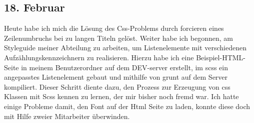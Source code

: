 \subsection{18. Februar}
Heute habe ich mich die Lösung des Css-Problems durch forcieren eines Zeilenumbruchs bei zu langen Titeln gelöst. Weiter habe ich begonnen, am Styleguide meiner Abteilung zu arbeiten, um Listenelemente mit verschiedenen Aufzählungskennzeichnern zu realisieren. Hierzu habe ich eine Beispiel-HTML-Seite in meinem Benutzerordner auf dem DEV-server erstellt, im scss ein angepasstes Listenelement gebaut und mithilfe von grunt auf dem Server kompiliert. Dieser Schritt diente dazu, den Prozess zur Erzeugung von css Klassen mit Scss kennen zu lernen, der mir bisher noch fremd war. Ich hatte einige Probleme damit, den Font auf der Html Seite zu laden, konnte diese doch mit Hilfe zweier Mitarbeiter überwinden.